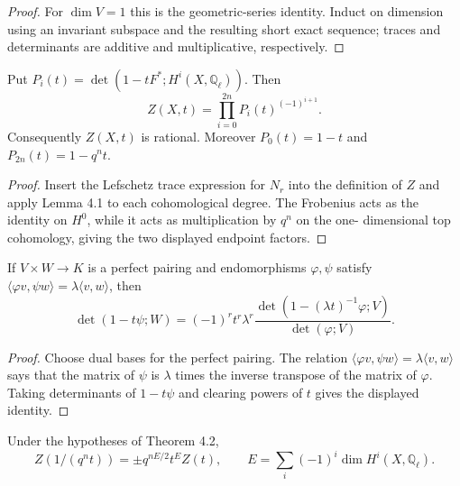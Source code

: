 \begin{proof}
For $\dim V=1$ this is the geometric-series identity.  Induct on dimension
using an invariant subspace and the resulting short exact sequence; traces and
determinants are additive and multiplicative, respectively.
\end{proof}



\begin{theorem}
\label{ha-appC-thm4-2}
Put $P_i(t)=\det(1-tF^*;H^i(X,\mathbb Q_\ell))$.  Then
\[
Z(X,t)=\prod_{i=0}^{2n}P_i(t)^{(-1)^{i+1}}.
\]
Consequently $Z(X,t)$ is rational.  Moreover $P_0(t)=1-t$ and
$P_{2n}(t)=1-q^nt$.
\end{theorem}
\begin{proof}
Insert the Lefschetz trace expression for $N_r$ into the definition of $Z$ and
apply Lemma 4.1 to each cohomological degree.  The Frobenius acts as the
identity on $H^0$, while it acts as multiplication by $q^n$ on the one-
dimensional top cohomology, giving the two displayed endpoint factors.
\end{proof}

\begin{lemma}
\label{ha-appC-lem4-3}
If $V\times W\to K$ is a perfect pairing and endomorphisms $\varphi,\psi$
satisfy $\langle\varphi v,\psi w\rangle=\lambda\langle v,w\rangle$,
then
\[
\det(1-t\psi;W)=(-1)^rt^r\lambda^r
\frac{\det(1-(\lambda t)^{-1}\varphi;V)}{\det(\varphi;V)}.
\]

\end{lemma}
\begin{proof}
Choose dual bases for the perfect pairing.  The relation
$\langle\varphi v,\psi w\rangle=\lambda\langle v,w\rangle$ says that the matrix of $\psi$ is
$\lambda$ times the inverse transpose of the matrix of $\varphi$.  Taking determinants of
$1-t\psi$ and clearing powers of $t$ gives the displayed identity.
\end{proof}

\begin{theorem}
\label{ha-appC-thm4-4}
Under the hypotheses of Theorem 4.2,
\[
Z(1/(q^nt))=\pm q^{nE/2}t^E Z(t),
\qquad E=\sum_i(-1)^i\dim H^i(X,\mathbb Q_\ell).
\]
\end{theorem}

